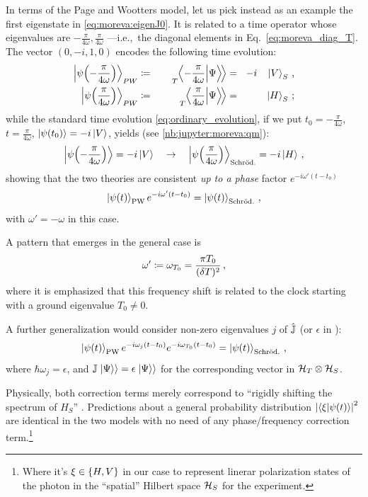 In terms of the Page and Wootters model,
let us pick instead as an example the first eigenstate in \eqref{eq:moreva:eigenJ0}.
It is related to a time operator whose eigenvalues are
$-\frac{\pi}{4\omega}, \frac{\pi}{4\omega}$
---i.e.,~the diagonal elements in Eq.~\eqref{eq:moreva_diag_T}.
The vector $(0, -i, 1, 0)$ encodes
the following time evolution:
\begin{alignat}{4}
  \ket{\psi\qty(-\frac{\pi}{4\omega})}_{PW}&{} \coloneqq&{\quad} \prescript{}{T}{\!\left.\left\langle -\frac{\pi}{4\omega} \middle| \Psi \right\rangle\!\right\rangle}&{} =\:\:\, -i&\ket{V}_S
  \, \text{,}
  \\
  \ket{\psi\qty( \frac{\pi}{4\omega})}_{PW}&{} \coloneqq&{\quad} \prescript{}{T}{\!\left.\left\langle \frac{\pi}{4\omega} \middle| \Psi \right\rangle\!\right\rangle} &{} =\:\:\,   &\ket{H}_S
  \, \text{;}
\end{alignat}
while the standard time evolution \eqref{eq:ordinary_evolution}, if we put
$t_0 = -\frac{\pi}{4\omega}$, $t = \frac{\pi}{4\omega}$, $\ket{\psi\qty(t_0)} = -i\ket{V}$,
yields (see \ref{nb:jupyter:moreva:qm}):
\begin{equation}
  \ket{\psi\qty(-\frac{\pi}{4\omega})} = -i\ket{V}
  \quad \rightarrow \quad
  \ket{\psi\qty( \frac{\pi}{4\omega})}_{\mathrm{Schr\ddot{o}d.}} = -i\ket{H}
  \, \text{,}
\end{equation}
showing that the two theories are consistent \emph{up to a phase} factor
$e^{-i\omega'(t - t_{0})}$
\begin{equation}
  \ket{\psi(t)}_{\mathrm{PW}} e^{-i\omega'(t - t_{0})} = \ket{\psi(t)}_{\mathrm{Schr\ddot{o}d.}} \,\text{,}
\end{equation}
with $\omega' = -\omega$ in this case.

A pattern that emerges in the general case is
\[
  \omega' \coloneqq \omega_{T_{0}} = \frac{\pi T_0}{(\delta T)^2} \,\text{,}
\]
where it is emphasized that this frequency shift is related to the clock starting
with a ground eigenvalue $T_0 \ne 0$.

A further generalization would consider non-zero eigenvalues $j$ of $\hat{\mathbb{J}}$
(or $\epsilon$ in \cite[eq. 16]{Lloyd:Time}):
\begin{equation}\label{eq:pw-vs-qm}
  \ket{\psi(t)}_{\mathrm{PW}} e^{-i\omega_{j}(t - t_{0})} e^{-i\omega_{T_0}(t - t_{0})} = \ket{\psi(t)}_{\mathrm{Schr\ddot{o}d.}} \,\text{,}
\end{equation}
where $\hbar\omega_j = \epsilon$,
and $\mathbb{J}\left.\left| \Psi \right\rangle\right\rangle = \epsilon \left.\left| \Psi \right\rangle\right\rangle$
for the corresponding vector in $\mathcal{H}_T \otimes \mathcal{H}_S$.

Physically, both correction terms merely
correspond to ``rigidly shifting the spectrum of $H_S$'' \parencite{Lloyd:Time}.
Predictions about a general probability distribution
$\abs{\braket{\xi}{\psi(t)}}^2$
are identical in the two models with no need of any phase/frequency correction term.\footnote{
  Where it's $\xi \in \qty{H, V}$
  in our case to represent linerar polarization states of the photon in
  the ``spatial'' Hilbert space $\mathcal{H}_S$
  for the experiment.
}

